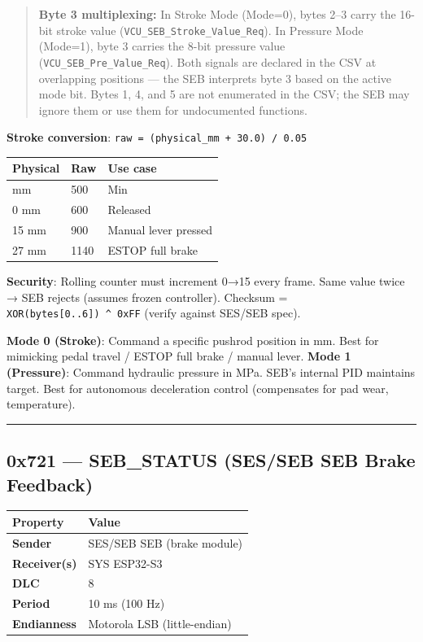 \begin{quote}
\textbf{Byte 3 multiplexing:} In Stroke Mode (Mode=0), bytes 2--3 carry the
16-bit stroke value (\texttt{VCU\_SEB\_Stroke\_Value\_Req}). In Pressure Mode
(Mode=1), byte 3 carries the 8-bit pressure value
(\texttt{VCU\_SEB\_Pre\_Value\_Req}). Both signals are declared in the CSV at
overlapping positions --- the SEB interprets byte 3 based on the active mode
bit. Bytes 1, 4, and 5 are not enumerated in the CSV; the SEB may ignore them or
use them for undocumented functions.
\end{quote}

\textbf{Stroke conversion}: \texttt{raw\ =\ (physical\_mm\ +\ 30.0)\ /\ 0.05}

\begin{longtable}[]{@{}lll@{}}
\toprule\noalign{}
Physical & Raw & Use case \\
\midrule\noalign{}
\endhead
\bottomrule\noalign{}
\endlastfoot
-5 mm & 500 & Min \\
0 mm & 600 & Released \\
15 mm & 900 & Manual lever pressed \\
27 mm & 1140 & ESTOP full brake \\
\end{longtable}

\textbf{Security}: Rolling counter must increment 0→15 every frame. Same value
twice → SEB rejects (assumes frozen controller). Checksum =
\texttt{XOR(bytes{[}0..6{]})\ \^{}\ 0xFF} (verify against SES/SEB spec).

\textbf{Mode 0 (Stroke)}: Command a specific pushrod position in mm. Best for
mimicking pedal travel / ESTOP full brake / manual lever. \textbf{Mode 1
(Pressure)}: Command hydraulic pressure in MPa. SEB's internal PID maintains
target. Best for autonomous deceleration control (compensates for pad wear,
temperature).

\begin{center}\rule{0.5\linewidth}{0.5pt}\end{center}

\subsection{0x721 --- SEB\_STATUS (SES/SEB SEB Brake
Feedback)}\label{x721-seb_status-SES/SEB-seb-brake-feedback}

\begin{longtable}[]{@{}ll@{}}
\toprule\noalign{}
Property & Value \\
\midrule\noalign{}
\endhead
\bottomrule\noalign{}
\endlastfoot
\textbf{Sender} & SES/SEB SEB (brake module) \\
\textbf{Receiver(s)} & SYS ESP32-S3 \\
\textbf{DLC} & 8 \\
\textbf{Period} & 10 ms (100 Hz) \\
\textbf{Endianness} & Motorola LSB (little-endian) \\
\end{longtable}


